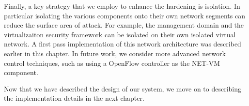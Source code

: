 Finally, a key strategy that we employ to enhance the hardening is isolation. In particular isolating the various components onto their own network segments can reduce the surface area of attack. For example, the management domain and the virtualizaiton security framework can be isolated on their own isolated virtual network. A first pass implementation of this network architecture was described earlier in this chapter. In future work, we consider more advanced network control techniques, such as using a OpenFlow controller as the NET-VM component.

Now that we have described the design of our system, we move on to describing the implementation details in the next chapter.




